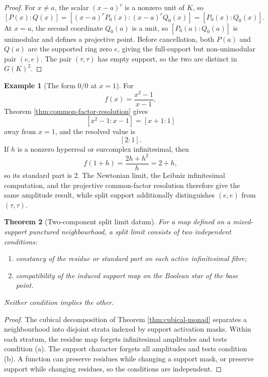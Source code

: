 \documentclass[11pt]{amsart}
\numberwithin{equation}{section}
\newtheorem{theorem}{Theorem}[section]
\theoremstyle{definition}
\newtheorem{example}[theorem]{Example}
\begin{document}
\begin{proof}
For $x\neq a$, the scalar $(x-a)^r$ is a nonzero unit of $K$, so
\[
[P(x):Q(x)]
=
[(x-a)^rP_0(x):(x-a)^rQ_0(x)]
=
[P_0(x):Q_0(x)].
\]
At $x=a$, the second coordinate $Q_0(a)$ is a unit, so $[P_0(a):Q_0(a)]$ is unimodular and defines a projective point.  Before cancellation, both $P(a)$ and $Q(a)$ are the supported ring zero $e$, giving the full-support but non-unimodular pair $(e,e)$.  The pair $(\tau,\tau)$ has empty support, so the two are distinct in $G(K)^2$.
\end{proof}

\begin{example}[The form $0/0$ at $x=1$]
For
\[
f(x)=\frac{x^2-1}{x-1},
\]
Theorem \ref{thm:common-factor-resolution} gives
\[
[x^2-1:x-1]=[x+1:1]
\]
away from $x=1$, and the resolved value is
\[
[2:1].
\]
If $h$ is a nonzero hyperreal or surcomplex infinitesimal, then
\[
f(1+h)=\frac{2h+h^2}{h}=2+h,
\]
so its standard part is $2$.  The Newtonian limit, the Leibniz infinitesimal computation, and the projective common-factor resolution therefore give the same amplitude result, while split support additionally distinguishes $(e,e)$ from $(\tau,\tau)$.
\end{example}

\begin{theorem}[Two-component split limit datum]\label{thm:two-component-limit}
For a map defined on a mixed-support punctured neighbourhood, a split limit consists of two independent conditions:
\begin{enumerate}[label=\textup{(\alph*)}]
\item constancy of the residue or standard part on each active infinitesimal fibre;
\item compatibility of the induced support map on the Boolean star of the base point.
\end{enumerate}
Neither condition implies the other.
\end{theorem}

\begin{proof}
The cubical decomposition of Theorem \ref{thm:cubical-monad} separates a neighbourhood into disjoint strata indexed by support activation masks.  Within each stratum, the residue map forgets infinitesimal amplitudes and tests condition (a).  The support character forgets all amplitudes and tests condition (b).  A function can preserve residues while changing a support mask, or preserve support while changing residues, so the conditions are independent.
\end{proof}
\end{document}
